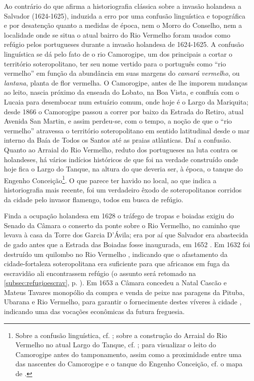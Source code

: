 Ao contrário do que afirma a historiografia clássica sobre a invasão holandesa a Salvador (1624-1625), induzida a erro por uma confusão linguística e topográfica e por desatenção quanto a medidas de época, nem o Morro do Conselho, nem a localidade onde se situa o atual bairro do Rio Vermelho foram usados como refúgio pelos portugueses durante a invasão holandesa de 1624-1625. A confusão linguística se dá pelo fato de o rio Camorogipe, um dos principais a cortar o território soteropolitano, ter seu nome vertido para o português como ``rio vermelho'' em função da abundância em suas margens do \textit{camará vermelho}, ou \textit{lantana}, planta de flor vermelha. O Camorogipe, antes de lhe imporem mudanças ao leito, nascia próximo da enseada do Lobato, na Boa Vista, e confluía com o Lucaia para desembocar num estuário comum, onde hoje é o Largo da Mariquita; desde 1866 o Camorogipe passou a correr por baixo da Estrada do Retiro, atual Avenida San Martin, e assim perdeu-se, com o tempo, a noção de que o ``rio vermelho'' atravessa o território soteropolitano em sentido latitudinal desde o mar interno da Baía de Todos os Santos até as praias atlânticas. Daí a confusão. Quanto ao Arraial do Rio Vermelho, reduto dos portugueses na luta contra os holandeses, há vários indícios históricos de que foi na verdade construído onde hoje fica o Largo do Tanque, na altura do que deveria ser, à época, o tanque do Engenho Conceição\footnote{Sobre a confusão linguística, cf. ; sobre a construção do Arraial do Rio Vermelho no atual Largo do Tanque, cf. ; para visualizar o leito do Camorogipe antes do tamponamento, assim como a proximidade entre uma das nascentes do Camorogipe e o tanque do Engenho Conceição, cf. o mapa de .}. O que parece ter havido no local, ao que indica a historiografia mais recente, foi um verdadeiro êxodo de soteropolitanos corridos da cidade pelo invasor flamengo, todos em busca de refúgio.

Finda a ocupação holandesa em 1628 o tráfego de tropas e boiadas exigiu do Senado da Câmara o conserto da ponte sobre o Rio Vermelho, no caminho que levava à casa da Torre dos Garcia D'Ávila; era por aí que Salvador era abastecida de gado antes que a Estrada das Boiadas fosse inaugurada, em 1652 \cite[pp.~315-316]{azevedo_povoamento_1969}. Em 1632 foi destruído um quilombo no Rio Vermelho \cite[p.~67]{VASCONCELOS2002}, indicando que o afastamento da cidade-fortaleza soteropolitana era suficiente para que africanos em fuga da escravidão ali encontrassem refúgio (o assunto será retomado na \autoref{subsec:refugioescrav}, p. \pageref{subsec:refugioescrav}). Em 1653 a Câmara concedeu a Natal Cascão e Mateus Tavares monopólio da compra e venda de peixe nas paragens da Pituba, Ubarana e Rio Vermelho, para garantir o fornecimente destes víveres à cidade \cite[p.~259]{azevedo_povoamento_1969}, indicando uma das vocações econômicas da futura freguesia.

